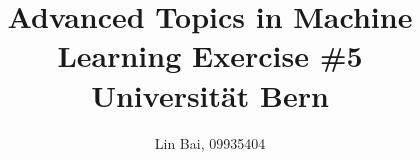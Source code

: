 \documentclass[12pt]{article}
\begin{document}
	
	
	
	\title{\textbf{Advanced Topics in Machine Learning Exercise \#{5}}\\
	Universit{\"a}t Bern}%
	\author{{Lin Bai, 09935404}} %
	
	\maketitle

\end{document}
